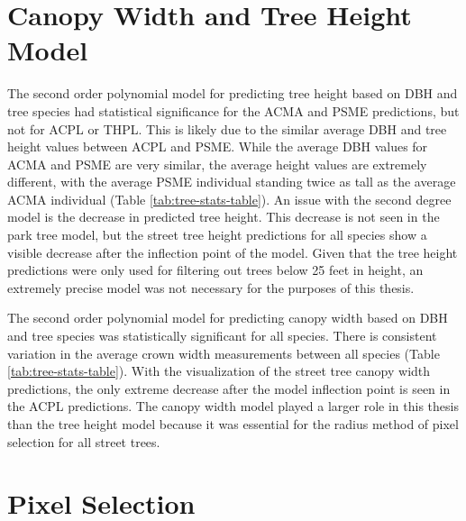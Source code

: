 \documentclass[12pt,twoside]{reedthesis}
\begin{document}
\hypertarget{canopy-width-and-tree-height-model-2}{%
\section{Canopy Width and Tree Height Model}\label{canopy-width-and-tree-height-model-2}}

The second order polynomial model for predicting tree height based on
DBH and tree species had statistical significance for the ACMA and PSME
predictions, but not for ACPL or THPL. This is likely due to the similar
average DBH and tree height values between ACPL and PSME. While the
average DBH values for ACMA and PSME are very similar, the average
height values are extremely different, with the average PSME individual
standing twice as tall as the average ACMA individual (Table
\ref{tab:tree-stats-table}). An issue with the second degree model is
the decrease in predicted tree height. This decrease is not seen in the
park tree model, but the street tree height predictions for all species
show a visible decrease after the inflection point of the model. Given
that the tree height predictions were only used for filtering out trees
below 25 feet in height, an extremely precise model was not necessary
for the purposes of this thesis.

The second order polynomial model for predicting canopy width based on
DBH and tree species was statistically significant for all species.
There is consistent variation in the average crown width measurements
between all species (Table \ref{tab:tree-stats-table}). With the
visualization of the street tree canopy width predictions, the only
extreme decrease after the model inflection point is seen in the ACPL
predictions. The canopy width model played a larger role in this thesis
than the tree height model because it was essential for the radius
method of pixel selection for all street trees.

\hypertarget{pixel-selection}{%
\section{Pixel Selection}\label{pixel-selection}}
\end{document}
